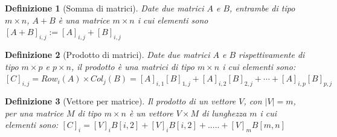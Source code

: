 \documentclass[a4paper]{article}
\newtheorem*{definition}{Definizione}
\begin{document}
\begin{definition}[Somma di matrici]Date due matrici $A$ e $B$, entrambe di tipo $m \times n$, $A + B$ è una matrice $m \times n$ i cui elementi sono $[A+B]_{i,j}:=[A]_{i,j}+[B]_{i,j}$
\end{definition}

\begin{definition}[Prodotto di matrici]Date due matrici $A$ e $B$ rispettivamente di tipo $m \times p$ e $p \times n$, il prodotto è una matrici di tipo $m \times n$ i cui elementi sono: $[C]_{i,j}=Row_{i}(A)\times Col_{j}(B)=[A]_{i,1}[B]_{1,j}+[A]_{i,2}[B]_{2,j}+\cdots +[A]_{i,p}[B]_{p,j}$
\end{definition}

\begin{definition}[Vettore per matrice]Il prodotto di un vettore $V$, con $|V| = m$, per una matrice $M$ di tipo $m \times n$ è un vettore $V \times M$ di lunghezza $m$ i cui elementi sono: $[C]_{i}=[V]_{i} B[i,2] + [V]_{i} B[i,2] + ..... + [V]_{m} B[m,n]$
\end{definition}
\end{document}
